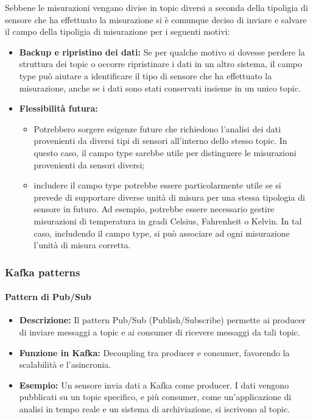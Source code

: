 Sebbene le misurazioni vengano divise in topic diversi a seconda della tipoligia di sensore che ha effettuato la misurazione si è comunque deciso di inviare e salvare il campo della tipoligia di misurazione per i seguenti motivi:
\begin{itemize}
    \item \textbf{Backup e ripristino dei dati:} Se per qualche motivo si dovesse perdere la struttura dei topic o occorre ripristinare i dati in un altro sistema, il campo type può aiutare a identificare il tipo di sensore che ha effettuato la misurazione, anche se i dati sono stati conservati insieme in un unico topic.
    \item \textbf{Flessibilità futura:} 
    \begin{itemize}
        \item Potrebbero sorgere esigenze future che richiedono l'analisi dei dati provenienti da diversi tipi di sensori all'interno dello stesso topic. In questo caso, il campo type sarebbe utile per distinguere le misurazioni provenienti da sensori diversi;
        \item includere il campo type potrebbe essere particolarmente utile se si prevede di supportare diverse unità di misura per una stessa tipologia di sensore in futuro. Ad esempio, potrebbe essere necessario gestire misurazioni di temperatura in gradi Celsius, Fahrenheit o Kelvin. In tal caso, includendo il campo type, si può associare ad ogni misurazione l'unità di misura corretta.
    \end{itemize}
\end{itemize}
    

\subsubsection{Kafka patterns}
\paragraph{Pattern di Pub/Sub}
\begin{itemize}
    \item \textbf{Descrizione:} Il pattern Pub/Sub (Publish/Subscribe) permette ai producer di inviare messaggi a topic e ai consumer di ricevere messaggi da tali topic.
    \item \textbf{Funzione in Kafka:} Decoupling tra producer e consumer, favorendo la scalabilità e l'asincronia.
    \item \textbf{Esempio:} Un sensore invia dati a Kafka come producer. I dati vengono pubblicati su un topic specifico, e più consumer, come un'applicazione di analisi in tempo reale e un sistema di archiviazione, si iscrivono al topic.
\end{itemize}


